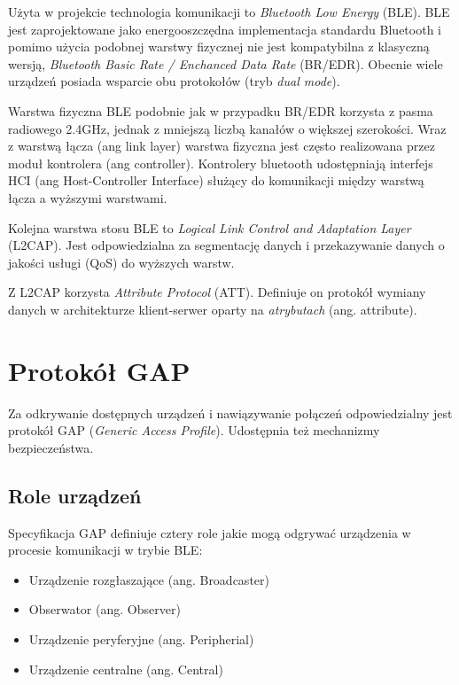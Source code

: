 \label{cha:komunikacja}

Użyta w projekcie technologia komunikacji to \emph{Bluetooth Low Energy} (BLE).
BLE jest zaprojektowane jako energooszczędna implementacja standardu Bluetooth
i pomimo użycia podobnej warstwy fizycznej nie jest kompatybilna z klasyczną
wersją, \emph{Bluetooth Basic Rate / Enchanced Data Rate} (BR/EDR). Obecnie
wiele urządzeń posiada wsparcie obu protokołów (tryb \emph{dual mode}).

Warstwa fizyczna BLE podobnie jak w przypadku BR/EDR korzysta z pasma radiowego
2.4GHz, jednak z mniejszą liczbą kanałów o większej szerokości. Wraz z warstwą
łącza (ang link layer) warstwa fizyczna jest często realizowana przez moduł
kontrolera (ang controller). Kontrolery bluetooth udostępniają interfejs HCI
(ang Host-Controller Interface) służący do komunikacji między warstwą łącza
a wyższymi warstwami. 

Kolejna warstwa stosu BLE to \emph{Logical Link Control and Adaptation Layer}
(L2CAP). Jest odpowiedzialna za segmentację danych i przekazywanie danych
o jakości usługi (QoS) do wyższych warstw.

Z L2CAP korzysta \emph{Attribute Protocol} (ATT). Definiuje on protokół wymiany
danych w architekturze klient-serwer oparty na \emph{atrybutach} (ang.
attribute).

\section{Protokół GAP}

Za odkrywanie dostępnych urządzeń i nawiązywanie połączeń odpowiedzialny jest
protokół GAP (\emph{Generic Access Profile}). Udostępnia też mechanizmy
bezpieczeństwa.

\subsection{Role urządzeń}

Specyfikacja GAP definiuje cztery role jakie mogą odgrywać urządzenia w procesie
komunikacji w trybie BLE:

\begin{itemize}

\item Urządzenie rozgłaszające (ang. Broadcaster)

\item Obserwator (ang. Observer)

\item Urządzenie peryferyjne (ang. Peripherial)

\item Urządzenie centralne (ang. Central)

\end{itemize}

